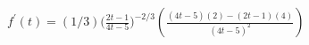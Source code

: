 $ \displaystyle f^{\prime}(t) = (1/3)\Big(  \frac{2t - 1}{4t - 5}  \Big)^{-2/3} \left( \frac{(4t - 5)(2) - (2t -1)(4)}{(4t - 5)^2}\right)$